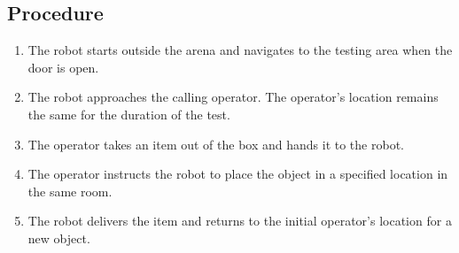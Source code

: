 \subsection*{Procedure}
\begin{enumerate}[nosep]
	\item The robot starts outside the arena and navigates to the testing area when the door is open.
	\item The robot approaches the calling operator. The operator's location remains the same for the duration of the test.
	\item The operator takes an item out of the box and hands it to the robot. 
	\item The operator instructs the robot to place the object in a specified location in the same room.
	\item The robot delivers the item and returns to the initial operator's location for a new object.
\end{enumerate}

